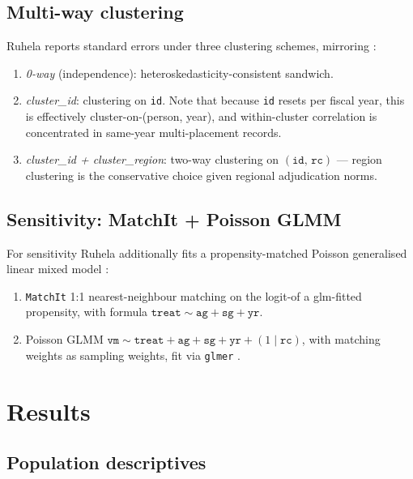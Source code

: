 \documentclass[11pt,a4paper]{article}
\newcommand{\1}{\mathbf{1}}
\theoremstyle{plain}
\theoremstyle{definition}
\begin{document}
\subsection{Multi-way clustering}\label{sec:clustering}

Ruhela reports standard errors under three clustering schemes, mirroring
\cite[notez1a.qmd]{ruhela2026otisrc}:
\begin{enumerate}
\setlength{\itemsep}{1pt}
\item \emph{0-way} (independence): heteroskedasticity-consistent
      sandwich.
\item \emph{cluster\_id}: clustering on \texttt{id}.  Note that
      because \texttt{id} resets per fiscal year, this is
      effectively cluster-on-(person, year), and within-cluster
      correlation is concentrated in same-year multi-placement
      records.
\item \emph{cluster\_id + cluster\_region}: two-way clustering on
      $(\texttt{id},\,\texttt{rc})$ — region clustering is the
      conservative choice given regional adjudication norms.
\end{enumerate}

\subsection{Sensitivity: MatchIt + Poisson GLMM}\label{sec:matchit}

For sensitivity Ruhela additionally fits a propensity-matched
Poisson generalised linear mixed model
\cite{lunceford2004ipw,austin2011smd}:
\begin{enumerate}
\setlength{\itemsep}{1pt}
\item \texttt{MatchIt} 1:1 nearest-neighbour matching on the logit-of
       a glm-fitted propensity, with formula
       $\texttt{treat} \sim \texttt{ag} + \texttt{sg} + \texttt{yr}$.
\item Poisson GLMM
       $\texttt{vm} \sim \texttt{treat} + \texttt{ag} + \texttt{sg} +
        \texttt{yr} + (1\mid\texttt{rc})$, with matching weights as
       sampling weights, fit via \texttt{glmer} \cite{Bates2015lme4}.
\end{enumerate}

\section{Results}\label{sec:results}

\subsection{Population descriptives}\label{sec:descriptives}
\end{document}
